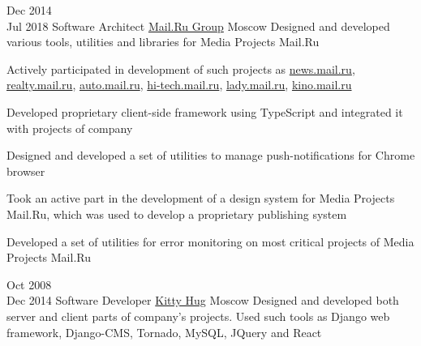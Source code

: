 \documentclass[11pt,a4paper,sans]{moderncv}
\newcommand{\lang}[2]{#2}
\begin{document}
\cventry
    {\lang{Дек}{Dec} 2014\\\lang{Июл}{Jul} 2018}
    {\lang
        {Архитектор программного обеспечения}
        {Software Architect}}
    {\href{https://corp.mail.ru}{Mail.Ru Group}}
    {\lang
        {Москва}
        {Moscow}}
    {}
    {\lang
        {Занимался проектированием и разработкой инструментов, утилит и библиотек в медиапроектах Mail.Ru.}
        {Designed and developed various tools, utilities and libraries for Media Projects Mail.Ru}}

\cvlistitem
    {\lang
        {Принимал участие в разработке проектов \href{https://news.mail.ru}{news.mail.ru}, \href{https://realty.mail.ru}{realty.mail.ru}, \href{https://auto.mail.ru}{auto.mail.ru}, \href{https://hi-tech.mail.ru}{hi-tech.mail.ru}, \href{https://lady.mail.ru}{lady.mail.ru}, \href{https://kino.mail.ru}{kino.mail.ru}}
        {Actively participated in development of such projects as \href{https://news.mail.ru}{news.mail.ru}, \href{https://realty.mail.ru}{realty.mail.ru}, \href{https://auto.mail.ru}{auto.mail.ru}, \href{https://hi-tech.mail.ru}{hi-tech.mail.ru}, \href{https://lady.mail.ru}{lady.mail.ru}, \href{https://kino.mail.ru}{kino.mail.ru}}}

\cvlistitem
    {\lang
        {Разработал фреймворк для создания клиентских приложений с использованием языка TypeScript}
        {Developed proprietary client-side framework using TypeScript and integrated it with projects of company}}

\cvlistitem
    {\lang
        {TODO ru}
        {Designed and developed a set of utilities to manage push-notifications for Chrome browser}}

\cvlistitem
    {\lang
        {TODO ru}
        {Took an active part in the development of a design system for Media Projects Mail.Ru, which was used to develop a proprietary publishing system}}

\cvlistitem
    {\lang
        {TODO ru}
        {Developed a set of utilities for error monitoring on most critical projects of Media Projects Mail.Ru}\\}





\cventry
    {\lang{Окт}{Oct} 2008\\\lang{Дек}{Dec} 2014}
    {\lang
        {Программист}
        {Software Developer}}
    {\href{http://kittyhug.ru}{Kitty Hug}}
    {\lang
        {Москва}
        {Moscow}}
    {}
    {\lang
        {Занимался разработкой и проектированием как серверной, так и клиентской части проектов компании. Использовал Django, Django-CMS, Tornado, MySQL, JQuery и React, занимался написанием юнит-тестов.}
        {Designed and developed both server and client parts of company's projects. Used such tools as Django web framework, Django-CMS, Tornado, MySQL, JQuery and React}}
\end{document}
